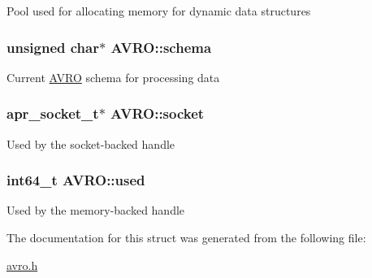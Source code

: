 Pool used for allocating memory for dynamic data structures \hypertarget{struct_a_v_r_o_e6ff7776029faa4c4d7053f0cb7b71e5}{
\subsubsection[{schema}]{\setlength{\rightskip}{0pt plus 5cm}unsigned char$\ast$ {\bf AVRO::schema}}}
\label{struct_a_v_r_o_e6ff7776029faa4c4d7053f0cb7b71e5}


Current \hyperlink{struct_a_v_r_o}{AVRO} schema for processing data \hypertarget{struct_a_v_r_o_33d50daaa50ad7ec3c4e22d4f1eb6143}{
\subsubsection[{socket}]{\setlength{\rightskip}{0pt plus 5cm}apr\_\-socket\_\-t$\ast$ {\bf AVRO::socket}}}
\label{struct_a_v_r_o_33d50daaa50ad7ec3c4e22d4f1eb6143}


Used by the socket-backed handle \hypertarget{struct_a_v_r_o_4ce667da8e13c2b9c464aa76b414ab82}{
\subsubsection[{used}]{\setlength{\rightskip}{0pt plus 5cm}int64\_\-t {\bf AVRO::used}}}
\label{struct_a_v_r_o_4ce667da8e13c2b9c464aa76b414ab82}


Used by the memory-backed handle 

The documentation for this struct was generated from the following file:\begin{CompactItemize}
\item 
\hyperlink{avro_8h}{avro.h}\end{CompactItemize}
